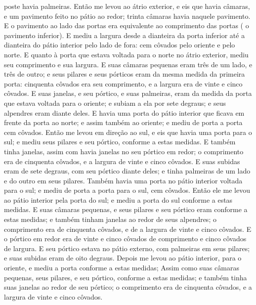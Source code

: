 {{} poste havia palmeiras.
  Então me levou ao átrio exterior, e eis que havia
{} câmaras, e um pavimento feito no pátio ao redor; trinta câmaras havia naquele pavimento.
  E o pavimento ao lado das portas era equivalente ao comprimento das portas (
{} o pavimento inferior).
  E mediu a largura desde a dianteira da porta inferior até a dianteira do pátio interior pelo lado de fora: cem côvados pelo oriente e pelo norte.
  E quanto à porta que estava voltada para o norte no átrio exterior, mediu seu comprimento e sua largura.
  E suas câmaras pequenas eram três de um lado, e três de outro; e seus pilares e seus pórticos eram da mesma medida da primeira porta: cinquenta côvados era seu comprimento, e a largura era de vinte e cinco côvados.
  E suas janelas, e seu pórtico, e suas palmeiras, eram da medida da porta que estava voltada para o oriente; e subiam a ela por sete degraus; e seus alpendres eram diante deles.
  E havia uma porta do pátio interior que ficava em frente da porta ao norte; e assim também
{} ao oriente; e mediu de porta a porta cem côvados.
  Então me levou em direção ao sul, e eis que havia uma porta para o sul; e mediu seus pilares e seu pórtico, conforme a estas medidas.
  E também tinha janelas, assim com havia janelas no seu pórtico em redor; o comprimento era de cinquenta côvados, e a largura de vinte e cinco côvados.
  E suas subidas eram de sete degraus, com seu pórtico diante deles; e tinha palmeiras de um lado e do outro em seus pilares.
  Também havia uma porta no pátio interior voltada para o sul; e mediu de porta a porta para o sul, cem côvados.
  Então ele me levou ao pátio interior pela porta do sul; e mediu a porta do sul conforme a estas medidas.
  E suas câmaras pequenas, e seus pilares e seu pórtico eram conforme a estas medidas; e também tinham janelas ao redor de seus alpendres; o comprimento era de cinquenta côvados, e de a largura de vinte e cinco côvados.
  E o pórtico em redor era de vinte e cinco côvados de comprimento e cinco côvados de largura.
  E seu pórtico estava no pátio externo, com palmeiras em seus pilares; e suas subidas eram de oito degraus.
  Depois me levou ao pátio interior, para o oriente, e mediu a porta conforme a estas medidas;
  Assim como suas câmaras pequenas, seus pilares, e seu pórtico, conforme a estas medidas; e também tinha suas janelas ao redor de seu pórtico; o comprimento era de cinquenta côvados, e a largura de vinte e cinco côvados.
}
